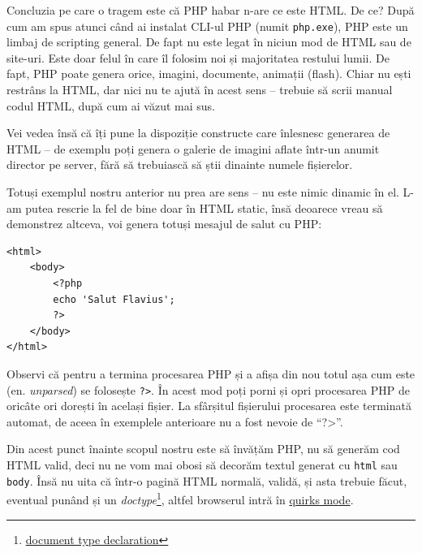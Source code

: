 Concluzia pe care o tragem este că PHP habar n-are ce este HTML. De ce?
După cum am spus atunci când ai instalat CLI-ul PHP (numit \texttt{php.exe}),
PHP este un limbaj de scripting general. De fapt nu este legat în niciun mod de
HTML sau de site-uri. Este doar felul în care îl folosim noi și majoritatea
restului lumii. De fapt, PHP poate genera orice, imagini, documente, animații
(flash). Chiar nu ești restrâns la HTML, dar nici nu te ajută în acest sens --
trebuie să scrii manual codul HTML, după cum ai văzut mai sus.

Vei vedea însă că îți pune la dispoziție constructe care înlesnesc generarea
de HTML -- de exemplu poți genera o galerie de imagini aflate într-un anumit
director pe server, fără să trebuiască să știi dinainte numele fișierelor.

Totuși exemplul nostru anterior nu prea are sens -- nu este nimic dinamic în el.
L-am putea rescrie la fel de bine doar în HTML static, însă deoarece
vreau să demonstrez altceva, voi genera totuși mesajul de salut cu PHP:
\begin{lstlisting}
<html>
	<body>
		<?php
		echo 'Salut Flavius';
		?>
	</body>
</html>
\end{lstlisting}

Observi că pentru a termina procesarea PHP și a afișa din nou totul
așa cum este (en. \textsl{unparsed}) se folosește \texttt{?>}.
În acest mod poți porni și opri procesarea PHP de oricâte ori dorești în același fișier.
La sfârșitul fișierului procesarea este terminată automat, de aceea în exemplele
anterioare nu a fost nevoie de ``?>''.


Din acest punct înainte scopul nostru este să învățăm PHP, nu să generăm
cod HTML valid, deci nu ne vom mai obosi să decorăm textul generat
cu \texttt{html} sau \texttt{body}. Însă nu uita că într-o pagină HTML
normală, validă, și asta trebuie făcut, eventual
punând și un
\textsl{doctype}\footnote{
\href{http://en.wikipedia.org/wiki/Document_Type_Declaration}{document type declaration}}, altfel
browserul intră în \href{http://en.wikipedia.org/wiki/Quirks_mode}{quirks mode}.

